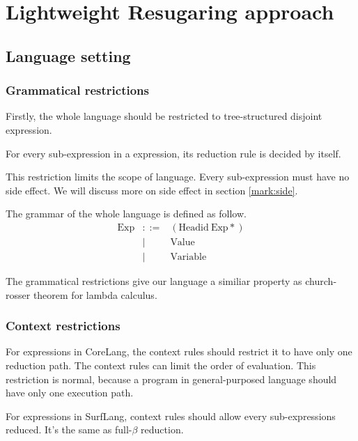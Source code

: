 
\section{Lightweight Resugaring approach}
\label{sec3}

\subsection{Language setting}

\subsubsection{Grammatical restrictions}
Firstly, the whole language should be restricted to tree-structured disjoint expression.

\begin{Def}[disjoint]
For every sub-expression in a expression, its reduction rule is decided by itself.
\end{Def}

This restriction limits the scope of language. Every sub-expression must have no side effect. We will discuss more on side effect in section \ref{mark:side}.

\begin{Def}
The grammar of the whole language is defined as follow.
\[
\begin{array}{rcl}
\mbox{Exp} &::=& (\mbox{Headid}~\mbox{Exp}*)\\
&|& \mbox{Value}\\
&|& \mbox{Variable}
\end{array}
\]
\end{Def}

The grammatical restrictions give our language a similiar property as church-rosser theorem\cite{churchrosser} for lambda calculus. 

\subsubsection{Context restrictions}
For expressions in CoreLang, the context rules should restrict it to have only one reduction path. The context rules can limit the order of evaluation. This restriction is normal, because a program in general-purposed language should have only one execution path.\label{mark:ctx}

For expressions in SurfLang, context rules should allow every sub-expressions reduced. It's the same as full-$\beta$ reduction.

